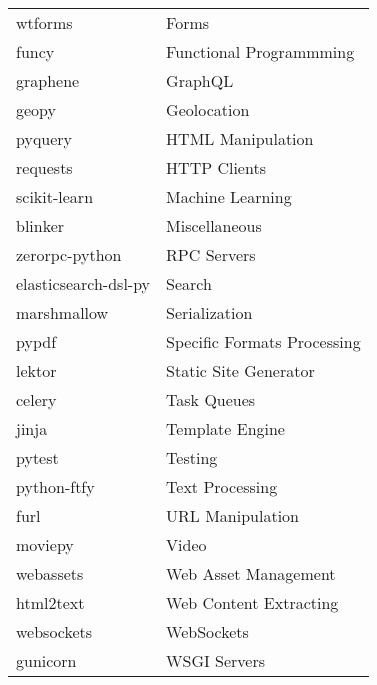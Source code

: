 \begin{longtable} {|l|l|}
    wtforms & Forms\\
    funcy & Functional Programmming\\
    graphene & GraphQL\\
    geopy & Geolocation\\
    pyquery & HTML Manipulation\\
    requests & HTTP Clients\\
    scikit-learn & Machine Learning\\
    blinker & Miscellaneous\\
    zerorpc-python & RPC Servers\\
    elasticsearch-dsl-py & Search\\
    marshmallow & Serialization\\
    pypdf & Specific Formats Processing\\
    lektor & Static Site Generator\\
    celery & Task Queues\\
    jinja & Template Engine\\
    pytest & Testing\\
    python-ftfy & Text Processing\\
    furl & URL Manipulation\\
    moviepy & Video\\
    webassets & Web Asset Management\\
    html2text & Web Content Extracting\\
    websockets & WebSockets\\
    gunicorn & WSGI Servers\\
 \end{longtable}
 
